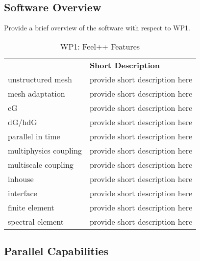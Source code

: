 \subsection{Software Overview}
\label{sec:WP1:Feel++:summary}

Provide a brief overview of the software with respect to WP1.

\begin{table}[h!]
    \centering
    { 
        \setlength{\parindent}{0pt}
        \def\arraystretch{1.25}
        {
            \fontsize{9}{11}\selectfont
            \begin{tabular}{!{\color{numpexgray}\vrule}p{.25\linewidth}!{\color{numpexgray}\vrule}p{.6885\linewidth}!{\color{numpexgray}\vrule}}
    
     &  {\rule{0pt}{2.5ex}\color{white}\bf Short Description }\\ 
    
    unstructured mesh & provide short description here \\
    mesh adaptation & provide short description here \\
    cG & provide short description here \\
    dG/hdG & provide short description here \\
    parallel in time & provide short description here \\
    multiphysics coupling & provide short description here \\
    multiscale coupling & provide short description here \\
    inhouse & provide short description here \\
    interface & provide short description here \\
    finite element & provide short description here \\
    spectral element & provide short description here \\
\end{tabular}
        }
    }
    \caption{WP1: Feel++ Features}
\end{table}


\subsection{Parallel Capabilities}
\label{sec:WP1:Feel++:performances}


